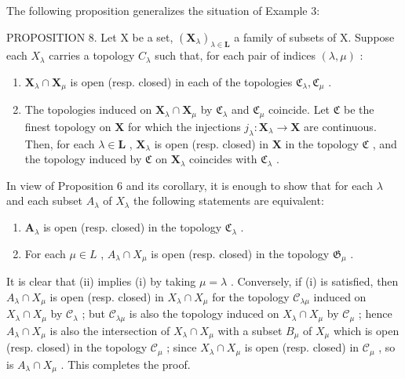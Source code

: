 The following proposition generalizes the situation of Example 3:

PROPOSITION 8. Let X be a set, \((\mathbf{X}_{\lambda})_{\lambda \in \mathbf{L}}\) a family of subsets of X. Suppose each \(X_{\lambda}\) carries a topology \(C_{\lambda}\) such that, for each pair of indices \((\lambda, \mu)\) :

\begin{enumerate}
\def\labelenumi{\arabic{enumi})}
\item
  \(\mathbf{X}_{\lambda} \cap \mathbf{X}_{\mu}\) is open (resp. closed) in each of the topologies \(\mathfrak{C}_{\lambda}, \mathfrak{C}_{\mu}\) .
\item
  The topologies induced on \(\mathbf{X}_{\lambda} \cap \mathbf{X}_{\mu}\) by \(\mathfrak{C}_{\lambda}\) and \(\mathfrak{C}_{\mu}\) coincide. Let \(\mathfrak{C}\) be the finest topology on \(\mathbf{X}\) for which the injections \(j_{\lambda}: \mathbf{X}_{\lambda} \to \mathbf{X}\) are continuous. Then, for each \(\lambda \in \mathbf{L}\) , \(\mathbf{X}_{\lambda}\) is open (resp. closed) in \(\mathbf{X}\) in the topology \(\mathfrak{C}\) , and the topology induced by \(\mathfrak{C}\) on \(\mathbf{X}_{\lambda}\) coincides with \(\mathfrak{C}_{\lambda}\) .
\end{enumerate}

In view of Proposition 6 and its corollary, it is enough to show that for each \(\lambda\) and each subset \(A_{\lambda}\) of \(X_{\lambda}\) the following statements are equivalent:

\begin{enumerate}
\def\labelenumi{(\roman{enumi})}
\item
  \(\mathbf{A}_{\lambda}\) is open (resp. closed) in the topology \(\mathfrak{C}_{\lambda}\) .
\item
  For each \(\mu \in L\) , \(A_{\lambda} \cap X_{\mu}\) is open (resp. closed) in the topology \(\mathfrak{G}_{\mu}\) .
\end{enumerate}

It is clear that (ii) implies (i) by taking \(\mu = \lambda\) . Conversely, if (i) is satisfied, then \(A_{\lambda} \cap X_{\mu}\) is open (resp. closed) in \(X_{\lambda} \cap X_{\mu}\) for the topology \(\mathcal{C}_{\lambda\mu}\) induced on \(X_{\lambda} \cap X_{\mu}\) by \(\mathcal{C}_{\lambda}\) ; but \(\mathcal{C}_{\lambda\mu}\) is also the topology induced on \(X_{\lambda} \cap X_{\mu}\) by \(\mathcal{C}_{\mu}\) ; hence \(A_{\lambda} \cap X_{\mu}\) is also the intersection of \(X_{\lambda} \cap X_{\mu}\) with a subset \(B_{\mu}\) of \(X_{\mu}\) which is open (resp. closed) in the topology \(\mathcal{C}_{\mu}\) ; since \(X_{\lambda} \cap X_{\mu}\) is open (resp. closed) in \(\mathcal{C}_{\mu}\) , so is \(A_{\lambda} \cap X_{\mu}\) . This completes the proof.

